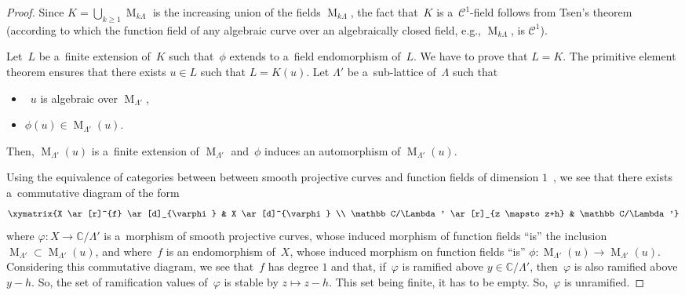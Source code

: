 \begin{proof}
Since $K = \bigcup_{k \geq 1} \operatorname{M}_{k \Lambda}$ is the increasing union of the f\/ields
$\operatorname{M}_{k \Lambda}$, the fact that~$K$ is a~$\mathcal{C}^{1}$-f\/ield follows from Tsen's
theorem~\cite{LangQAC} (according to which the function f\/ield of any algebraic curve over an algebraically closed f\/ield,
e.g.,
$\operatorname{M}_{k \Lambda}$, is $\mathcal{C}^{1}$).

Let~$L$ be a~f\/inite extension of~$K$ such that~$\phi$ extends to a~f\/ield endomorphism of~$L$.
We have to prove that $L=K$.
The primitive element theorem ensures that there exists $u \in L$ such that $L=K(u)$.
Let $\Lambda'$ be a~sub-lattice of~$\Lambda$ such that
\begin{itemize}
\itemsep=0pt
\item~$u$ is algebraic over $\operatorname{M}_{\Lambda'}$,
\item $\phi(u) \in \operatorname{M}_{\Lambda'}(u)$.
\end{itemize}
Then, $\operatorname{M}_{\Lambda'}(u)$ is a~f\/inite extension of $\operatorname{M}_{\Lambda'}$ and~$\phi$ induces an
automorphism of $\operatorname{M}_{\Lambda'}(u)$.

Using the equivalence of categories between between smooth projective curves and function f\/ields of dimension
$1$~\cite[Corollary 6.12]{HartshorneAG}, we see that there exists a~commutative diagram of the form
\begin{gather*}
\xymatrix{X \ar[r]^{f} \ar[d]_{\varphi} &  X \ar[d]^{\varphi}
\\
\mathbb C/\Lambda' \ar[r]_{z \mapsto z+h}  & \mathbb C/\Lambda'}
\end{gather*}
where $\varphi: X \rightarrow \mathbb C/\Lambda'$ is a~morphism of smooth projective curves, whose induced morphism of
function f\/ields ``is'' the inclusion $\operatorname{M}_{\Lambda'} \subset \operatorname{M}_{\Lambda'}(u)$, and where~$f$
is an endomorphism of~$X$, whose induced morphism on function f\/ields ``is'' $\phi: \operatorname{M}_{\Lambda'}(u)
\rightarrow \operatorname{M}_{\Lambda'}(u)$.
Considering this commutative diagram, we see that~$f$ has degree $1$ and that, if~$\varphi$ is ramif\/ied above $y \in
\mathbb C/\Lambda'$, then~$\varphi$ is also ramif\/ied above $y-h$.
So, the set of ramif\/ication values of~$\varphi$ is stable by $z \mapsto z-h$.
This set being f\/inite, it has to be empty.
So,~$\varphi$ is unramif\/ied.


\end{proof}
